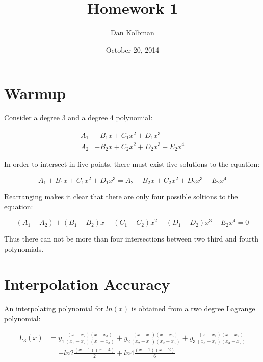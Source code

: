 \documentclass[12pt]{article}
\title{Homework 1}
\author{Dan Kolbman}
\date{October 20, 2014}
\begin{document}
  
  \maketitle

 
  \section{Warmup}

  Consider a degree 3 and a degree 4 polynomial:

  \begin{align}
    \label{eq:poly3}
    A_1 &+ B_1x + C_1x^2+D_1x^3          \\
    \label{eq:poly4}
    A_2 &+ B_2x + C_2x^2+D_2x^3+E_2x^4
  \end{align}

  In order to intersect in five points, there must exist five solutions to the
  equation:

  \begin{equation}
    A_1+B_1x+C_1x^2+D_1x^3=A_2+B_2x+C_2x^2+D_2x^3+E_2x^4 \nonumber
  \end{equation}

  Rearranging makes it clear that there are only four possible soltions to the
  equation:
  
  \begin{equation}
    (A_1-A_2) + (B_1-B_2)x + (C_1-C_2)x^2 + (D_1-D_2)x^3 - E_2x^4 = 0 \nonumber
  \end{equation}

  Thus there can not be more than four intersections between two third and fourth
  polynomials.

  \section{Interpolation Accuracy}

  An interpolating polynomial for $ln(x)$ is obtained from a two degree Lagrange polynomial:

  \begin{align}
    L_3(x) &= y_1\frac{(x-x_2)(x-x_3)}{(x_1-x_2)(x_1-x_3)} + y_2\frac{(x-x_1)(x-x_3)}{(x_2-x_1)(x_2-x_3)} + y_3\frac{(x-x_1)(x-x_2)}{(x_3-x_1)(x_3-x_2)} \nonumber \\
    \label{eq:lninter}
    &= -ln2\frac{(x-1)(x-4)}{2} + ln4\frac{(x-1)(x-2)}{6}
  \end{align}
\end{document}
